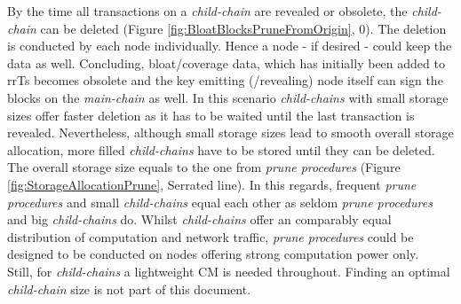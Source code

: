 \noindent By the time all transactions on a \textit{child-chain} are revealed or obsolete, the \textit{child-chain} can be deleted (Figure \ref{fig:BloatBlocksPruneFromOrigin}, 0).
The deletion is conducted by each node individually.
Hence a node - if desired - could keep the data as well.
Concluding, bloat/coverage data, which has initially been added to \gls{rrTs} becomes obsolete and
the key emitting (/revealing) node itself can sign the blocks on the \textit{main-chain} as well.
In this scenario \textit{child-chains} with small storage sizes offer faster deletion as it has to be waited until the last transaction is revealed.
Nevertheless, although small storage sizes lead to smooth overall storage allocation,
more filled \textit{child-chains} have to be stored until they can be deleted. \\
The overall storage size equals to the one from \textit{prune procedures} (Figure \ref{fig:StorageAllocationPrune}, Serrated line).
In this regards, frequent \textit{prune procedures} and small \textit{child-chains} equal each other as
seldom \textit{prune procedures} and big \textit{child-chains} do.
Whilst \textit{child-chains} offer an comparably equal distribution of computation and network traffic,
\textit{prune procedures} could be designed to be conducted on nodes offering strong computation power only. \\
Still, for \textit{child-chains} a lightweight \gls{CM} is needed throughout.
Finding an optimal \textit{child-chain} size is not part of this document.



